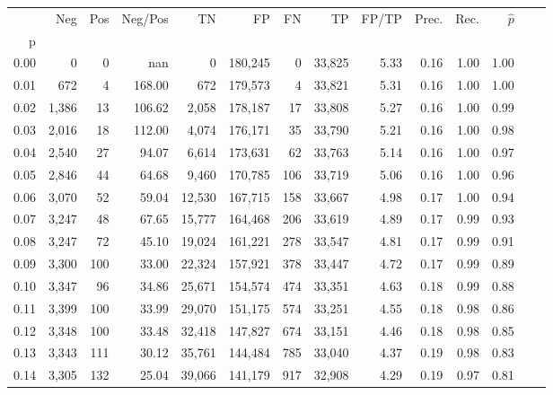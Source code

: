 \begin{tabular}{rrrrrrrrrrrrrr}
\toprule
{} &    Neg &  Pos & Neg/Pos &       TN &       FP &      FN &      TP & FP/TP & Prec. &  Rec. & $\hat{p}$ \\
p    &        &      &         &          &          &         &         &       &       &       &           \\
\midrule
0.00 &      0 &    0 &     nan &        0 &  180,245 &       0 &  33,825 &  5.33 &  0.16 &  1.00 &      1.00 \\
0.01 &    672 &    4 &  168.00 &      672 &  179,573 &       4 &  33,821 &  5.31 &  0.16 &  1.00 &      1.00 \\
0.02 &  1,386 &   13 &  106.62 &    2,058 &  178,187 &      17 &  33,808 &  5.27 &  0.16 &  1.00 &      0.99 \\
0.03 &  2,016 &   18 &  112.00 &    4,074 &  176,171 &      35 &  33,790 &  5.21 &  0.16 &  1.00 &      0.98 \\
0.04 &  2,540 &   27 &   94.07 &    6,614 &  173,631 &      62 &  33,763 &  5.14 &  0.16 &  1.00 &      0.97 \\
0.05 &  2,846 &   44 &   64.68 &    9,460 &  170,785 &     106 &  33,719 &  5.06 &  0.16 &  1.00 &      0.96 \\
0.06 &  3,070 &   52 &   59.04 &   12,530 &  167,715 &     158 &  33,667 &  4.98 &  0.17 &  1.00 &      0.94 \\
0.07 &  3,247 &   48 &   67.65 &   15,777 &  164,468 &     206 &  33,619 &  4.89 &  0.17 &  0.99 &      0.93 \\
0.08 &  3,247 &   72 &   45.10 &   19,024 &  161,221 &     278 &  33,547 &  4.81 &  0.17 &  0.99 &      0.91 \\
0.09 &  3,300 &  100 &   33.00 &   22,324 &  157,921 &     378 &  33,447 &  4.72 &  0.17 &  0.99 &      0.89 \\
0.10 &  3,347 &   96 &   34.86 &   25,671 &  154,574 &     474 &  33,351 &  4.63 &  0.18 &  0.99 &      0.88 \\
0.11 &  3,399 &  100 &   33.99 &   29,070 &  151,175 &     574 &  33,251 &  4.55 &  0.18 &  0.98 &      0.86 \\
0.12 &  3,348 &  100 &   33.48 &   32,418 &  147,827 &     674 &  33,151 &  4.46 &  0.18 &  0.98 &      0.85 \\
0.13 &  3,343 &  111 &   30.12 &   35,761 &  144,484 &     785 &  33,040 &  4.37 &  0.19 &  0.98 &      0.83 \\
0.14 &  3,305 &  132 &   25.04 &   39,066 &  141,179 &     917 &  32,908 &  4.29 &  0.19 &  0.97 &      0.81 \\

\end{tabular}
